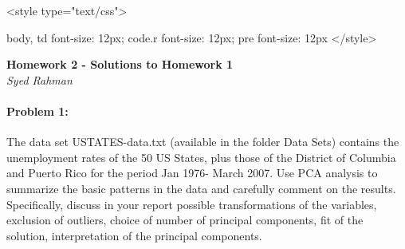 \documentclass[12pt, leqno]{article}\usepackage[]{graphicx}\usepackage[]{color}
\begin{document}
<style type="text/css">

body, td {
   font-size: 12px;
}
code.r{
  font-size: 12px;
}
pre {
  font-size: 12px
}
</style>
\pagestyle{fancy}

\begin{center}
{\large {\bf Homework 2 - Solutions to Homework 1}} \\
{\it{Syed Rahman}} \\
\end{center}

\paragraph{Problem 1:}

The data set USTATES-data.txt (available in the folder Data Sets) contains the unemployment rates of the 50 US States, plus those of the District of Columbia and Puerto Rico for the period Jan 1976- March 2007.
Use PCA analysis to summarize the basic patterns in the data and carefully comment on the results.
Specifically, discuss in your report possible transformations of the variables, exclusion of outliers, choice of number of principal components, fit of the solution, interpretation of the principal components.
\end{document}
